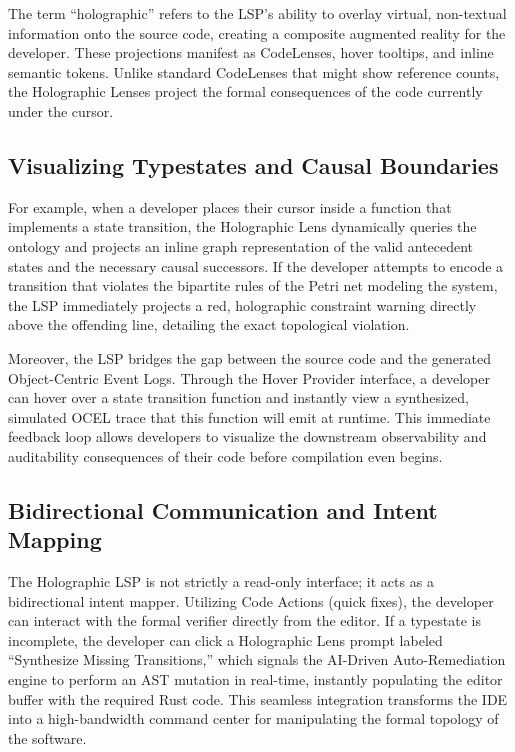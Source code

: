 The term ``holographic'' refers to the LSP's ability to overlay virtual, non-textual information onto the source code, creating a composite augmented reality for the developer. These projections manifest as CodeLenses, hover tooltips, and inline semantic tokens. Unlike standard CodeLenses that might show reference counts, the Holographic Lenses project the formal consequences of the code currently under the cursor. 

\subsection{Visualizing Typestates and Causal Boundaries}

For example, when a developer places their cursor inside a function that implements a state transition, the Holographic Lens dynamically queries the ontology and projects an inline graph representation of the valid antecedent states and the necessary causal successors. If the developer attempts to encode a transition that violates the bipartite rules of the Petri net modeling the system, the LSP immediately projects a red, holographic constraint warning directly above the offending line, detailing the exact topological violation.

Moreover, the LSP bridges the gap between the source code and the generated Object-Centric Event Logs. Through the Hover Provider interface, a developer can hover over a state transition function and instantly view a synthesized, simulated OCEL trace that this function will emit at runtime. This immediate feedback loop allows developers to visualize the downstream observability and auditability consequences of their code before compilation even begins.

\subsection{Bidirectional Communication and Intent Mapping}

The Holographic LSP is not strictly a read-only interface; it acts as a bidirectional intent mapper. Utilizing Code Actions (quick fixes), the developer can interact with the formal verifier directly from the editor. If a typestate is incomplete, the developer can click a Holographic Lens prompt labeled ``Synthesize Missing Transitions,'' which signals the AI-Driven Auto-Remediation engine to perform an AST mutation in real-time, instantly populating the editor buffer with the required Rust code. This seamless integration transforms the IDE into a high-bandwidth command center for manipulating the formal topology of the software.

